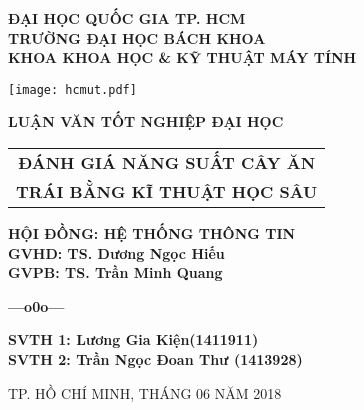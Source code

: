 \begin{titlepage}
\thispagestyle{empty}
\vspace{-2cm}
\begin{center}
\large 
	\bfseries{ĐẠI HỌC QUỐC GIA TP. HCM}\\[0.3cm]
	\bfseries{TRƯỜNG ĐẠI HỌC BÁCH KHOA} \\ [0.3cm]
	\bfseries{KHOA KHOA HỌC \& KỸ THUẬT MÁY TÍNH} \\
\end{center}

\vspace{0.4cm}
\begin{center}
\texttt{[image: hcmut.pdf]}\\[1cm]
\end{center}
\vspace{-0.75cm}
\begin{center}
\large 
	\bfseries LUẬN VĂN TỐT NGHIỆP ĐẠI HỌC \\
\end{center}
\vspace{-1.25cm}
\begin{center}
\Huge
	\begin{tabular}{@{}c}
		\bfseries{ĐÁNH GIÁ NĂNG SUẤT CÂY ĂN } \\ 
		\bfseries{TRÁI BẰNG KĨ THUẬT HỌC SÂU} \\[0.5cm]
	\end{tabular}
\end{center}
	
\hspace{4.5cm}	
\begin{minipage}[t]{0.7\linewidth}
\large
	\textbf{HỘI ĐỒNG: HỆ THỐNG THÔNG TIN}\\ [0.5cm]
	\textbf{GVHD: TS. Dương Ngọc Hiếu}\\ [0.5cm]
	\textbf{GVPB: TS. Trần Minh Quang}\\
	\vspace{-0.7cm}
	\begin{center}
	\textbf{---o0o---}
	\end{center}
	\textbf{SVTH 1: Lương Gia Kiện(1411911)}\\ [0.5cm]
	\textbf{SVTH 2: Trần Ngọc Đoan Thư (1413928)}\\
\end{minipage}

\vfill
\centerline{\large{TP. HỒ CHÍ MINH, THÁNG 06 NĂM 2018}}
\end{titlepage}